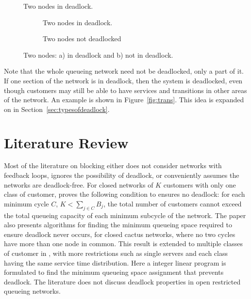 \documentclass{article}
\begin{document}
\begin{figure}[H]
  \begin{center}
  
  \caption{Two nodes in deadlock.}
  \label{fig:2in_deadlock}
  \end{center}
\end{figure}

\begin{figure}[H]
\begin{subfigure}[b]{0.5\textwidth}
  
  \caption{Two nodes in deadlock.}
  \label{fig:inout_deadlock_in}
\end{subfigure}
\begin{subfigure}[b]{0.5\textwidth}
  
  \caption{Two nodes not deadlocked}
  \label{fig:inout_deadlock_out}
\end{subfigure}
\caption{Two nodes: a) in deadlock and b) not in deadlock.}
\label{fig:inout_deadlock}
\end{figure}

Note that the whole queueing network need not be deadlocked, only a part of it.
If one section of the network is in deadlock, then the system is deadlocked, even though customers may still be able to have services and transitions in other areas of the network.
An example is shown in Figure~\ref{fig:trans}.
This idea is expanded on in Section~\ref{sec:typesofdeadlock}.

\section{Literature Review}

Most of the literature on blocking either does not consider networks with feedback loops, ignores the possibility of deadlock, or conveniently assumes the networks are
deadlock-free.
For closed networks of $K$ customers with only one class of customer, \cite{kunduakyildiz89} proves the following condition to ensures no deadlock: for each minimum cycle $C$, $K < \sum_{j\in C} B_j$, the total number of customers cannot exceed the total queueing capacity of each minimum subcycle of the network.
The paper also presents algorithms for finding the minimum queueing space required to ensure deadlock never occurs, for closed cactus networks, where no two cycles have more than one node in common.
This result is extended to multiple classes of customer in \cite{liebeherrakyildiz95}, with more restrictions such as single servers and each class having the same service time distribution.
Here a integer linear program is formulated to find the minimum queueing space assignment that prevents deadlock.
The literature does not discuss deadlock properties in open restricted queueing networks.
\end{document}
